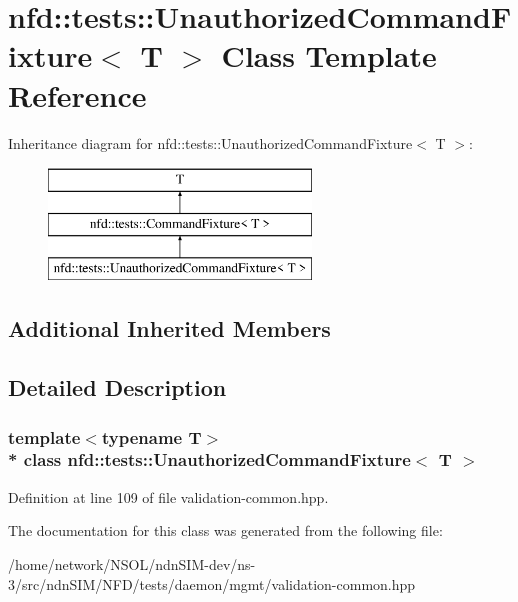 \hypertarget{classnfd_1_1tests_1_1UnauthorizedCommandFixture}{}\section{nfd\+:\+:tests\+:\+:Unauthorized\+Command\+Fixture$<$ T $>$ Class Template Reference}
\label{classnfd_1_1tests_1_1UnauthorizedCommandFixture}
Inheritance diagram for nfd\+:\+:tests\+:\+:Unauthorized\+Command\+Fixture$<$ T $>$\+:\begin{figure}[H]
\begin{center}
\leavevmode
\includegraphics[height=3.000000cm]{classnfd_1_1tests_1_1UnauthorizedCommandFixture}
\end{center}
\end{figure}
\subsection*{Additional Inherited Members}


\subsection{Detailed Description}
\subsubsection*{template$<$typename T$>$\\*
class nfd\+::tests\+::\+Unauthorized\+Command\+Fixture$<$ T $>$}



Definition at line 109 of file validation-\/common.\+hpp.



The documentation for this class was generated from the following file\+:\begin{DoxyCompactItemize}
\item 
/home/network/\+N\+S\+O\+L/ndn\+S\+I\+M-\/dev/ns-\/3/src/ndn\+S\+I\+M/\+N\+F\+D/tests/daemon/mgmt/validation-\/common.\+hpp\end{DoxyCompactItemize}
